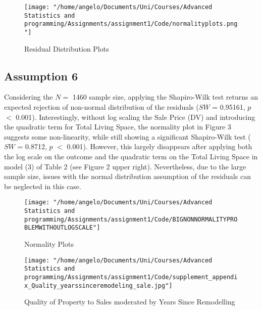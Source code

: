 \documentclass[a4paper]{article}
\begin{document}
\begin{wrapfigure}{L}{11.5cm}
		\centering
         \texttt{[image: "/home/angelo/Documents/Uni/Courses/Advanced Statistics and programming/Assignments/assignment1/Code/normalityplots.png"]}
         \small
         \caption{Residual Distribution Plots}
\end{wrapfigure}




\subsection{Assumption 6}
Considering the $N=$ 1460 sample size, applying the Shapiro-Wilk test returns an expected rejection of non-normal distribution of the residuals ($SW$ = 0.95161,  $p$ $<$ 0.001). Interestingly, without log scaling the Sale Price (DV) and introducing the quadratic term for Total Living Space, the normality plot in Figure 3 suggests some non-linearity, while still showing a significant Shapiro-Wilk test ($SW$ = 0.8712,  $p$ $<$ 0.001). However, this largely disappears after applying both the log scale on the outcome and the quadratic term on the Total Living Space in model (3) of Table 2 (see Figure 2 upper right). Nevertheless, due to the large sample size, issues with the normal distribution assumption of the residuals can be neglected in this case. 
\begin{figure}
		\centering
         \texttt{[image: "/home/angelo/Documents/Uni/Courses/Advanced Statistics and programming/Assignments/assignment1/Code/BIGNONNORMALITYPROBLEMWITHOUTLOGSCALE"]}
         \small
         \caption{Normality Plots}
\end{figure}

\begin{figure}
		\centering
         \texttt{[image: "/home/angelo/Documents/Uni/Courses/Advanced Statistics and programming/Assignments/assignment1/Code/supplement\_appendix\_Quality\_yearssinceremodeling\_sale.jpg"]}
         \small
         \captionsetup{justification=centering,margin=0cm}
         \caption{Quality of Property to Sales moderated by Years Since Remodelling}
\end{figure}
\end{document}
